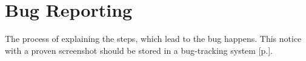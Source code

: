\section{Bug Reporting}
\label{sec:Bug Reporting}

The process of explaining the steps, which lead to the bug happens. This notice with a proven screenshot should be stored in a bug-tracking system [p.\pageref{sec:Bug Tracking System}].
